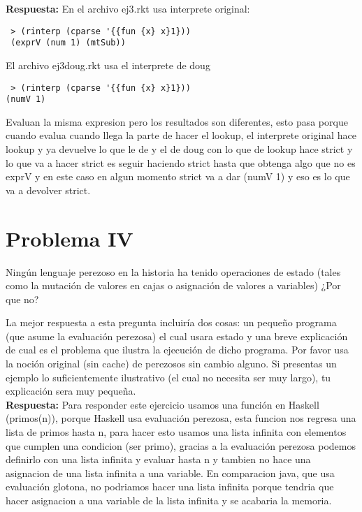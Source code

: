 \documentclass{article}
\begin{document}
\textbf{Respuesta: }
En el archivo ej3.rkt usa interprete original:
\begin{verbatim}
 > (rinterp (cparse '{{fun {x} x}1}))
 (exprV (num 1) (mtSub))
\end{verbatim}
El archivo ej3doug.rkt usa el interprete de doug
\begin{verbatim}
 > (rinterp (cparse '{{fun {x} x}1}))
(numV 1)
\end{verbatim}
Evaluan la misma expresion pero los resultados son diferentes, esto pasa porque cuando 
evalua cuando llega la parte de hacer el lookup, el interprete original hace lookup y
ya devuelve lo que le de y el de doug con lo que de lookup hace strict y lo que va a hacer
strict es seguir haciendo strict hasta que obtenga algo que no es exprV y en este caso
en algun momento strict va a dar (numV 1) y eso es lo que va a devolver strict. 


\section*{Problema IV}
Ningún lenguaje perezoso en la historia ha tenido operaciones de estado (tales
como la mutación de valores en cajas o asignación de valores a variables) ¿Por
que no?

La mejor respuesta a esta pregunta incluiría dos cosas: un pequeño programa (que
asume la evaluación perezosa) el cual usara estado y una breve explicación de cual
es el problema que ilustra la ejecución de dicho programa. Por favor usa la
noción original (sin cache) de perezosos sin cambio alguno. Si presentas un
ejemplo lo suficientemente ilustrativo (el cual no necesita ser muy largo), tu
explicación sera muy pequeña.
\\

\textbf{Respuesta: }
Para responder este ejercicio usamos una función en Haskell (primos(n)), porque Haskell usa evaluación perezosa, esta funcion nos regresa una lista de primos hasta n, para hacer esto usamos una lista infinita con elementos que cumplen una condicion (ser primo), gracias a la evaluación perezosa podemos definirlo con una lista infinita y evaluar hasta n y tambien no hace una asignacion de una lista infinita a una variable. En comparacion java, que usa evaluación glotona, no podriamos hacer una lista infinita porque tendria que hacer asignacion a una variable de la lista infinita y se acabaria la memoria.
\end{document}
